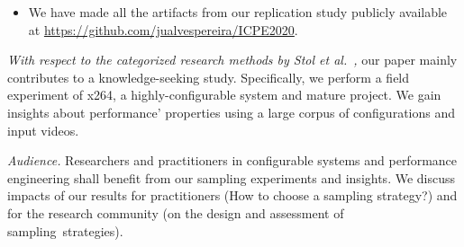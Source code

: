 \begin{itemize}
    \item We have made all the artifacts from our replication study publicly available at \url{https://github.com/jualvespereira/ICPE2020}.
    
\end{itemize}


\emph{With respect to the categorized research methods by Stol et al.~\cite{Stol:2018:ASE:3276753.3241743},} our paper mainly contributes to a knowledge-seeking study. Specifically, we perform a field experiment of x264, a highly-configurable system and mature project. We gain insights about performance' properties using a large corpus of configurations and input videos. 

\emph{Audience.} Researchers and practitioners in configurable systems and performance engineering shall benefit from our sampling experiments and insights. We discuss impacts of our results for practitioners (How to choose a sampling strategy?) and for the research community (\eg on the design and assessment of \mbox{sampling strategies).} 
 

